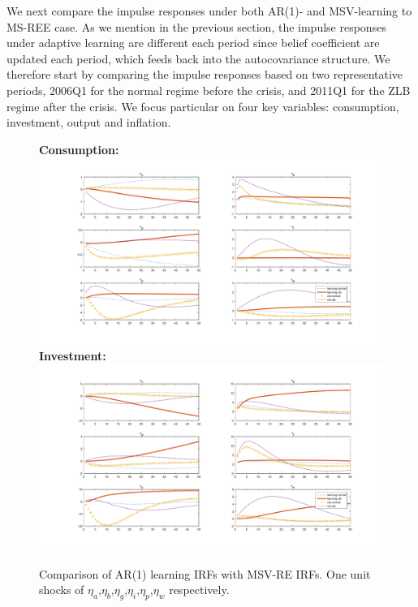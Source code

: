 \documentclass[12pt,reqno]{article}
\numberwithin{equation}{section}
\begin{document}

We next compare the impulse responses under both AR(1)- and MSV-learning to MS-REE case. As we mention in the previous section, the impulse responses under adaptive learning are different each period since belief coefficient are updated each period, which feeds back into the autocovariance structure. We therefore start by comparing the impulse responses based on two representative periods, 2006Q1 for the normal regime before the crisis, and 2011Q1 for the ZLB regime after the crisis. We focus particular on four key variables: consumption, investment, output and inflation. \\
\noindent




\begin{figure}[H]
\label{irf_ar1_1}
\caption{Comparison of AR(1) learning IRFs with MSV-RE IRFs. One unit shocks of $\eta_a$,$\eta_b$,$\eta_g$,$\eta_i$,$\eta_p$,$\eta_w$ respectively.}
\textbf{Consumption:}\\
\includegraphics[scale=0.5]{AR1_impresp_cons_riseComp.pdf}
\textbf{Investment:}\\
\includegraphics[scale=0.5]{AR1_impresp_inv_riseComp.pdf}

\end{figure}
\end{document}
